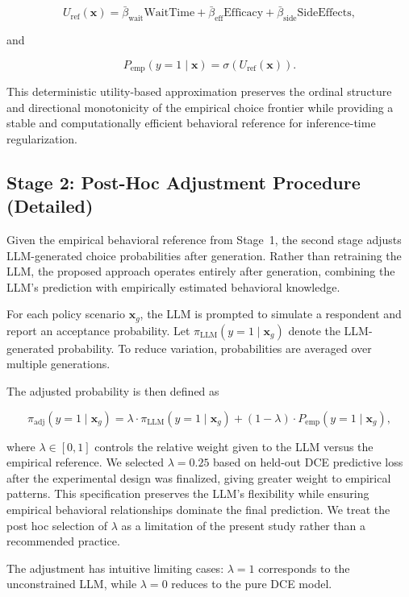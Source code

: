 \documentclass[11pt]{article}
\begin{document}
\[
U_{\mathrm{ref}}(\mathbf{x})
=
\bar{\beta}_{\mathrm{wait}}\mathrm{WaitTime}
+
\bar{\beta}_{\mathrm{eff}}\mathrm{Efficacy}
+
\bar{\beta}_{\mathrm{side}}\mathrm{SideEffects},
\]

and

\[
P_{\mathrm{emp}}(y=1\mid\mathbf{x})
=
\sigma\!\left(U_{\mathrm{ref}}(\mathbf{x})\right).
\]

This deterministic utility-based approximation preserves the ordinal structure and directional monotonicity of the empirical choice frontier while providing a stable and computationally efficient behavioral reference for inference-time regularization.
\subsection{Stage 2: Post-Hoc Adjustment Procedure (Detailed)}
\label{sec:stage2}

Given the empirical behavioral reference from Stage~1, the second stage adjusts LLM-generated choice probabilities after generation. Rather than retraining the LLM, the proposed approach operates entirely after generation, combining the LLM's prediction with empirically estimated behavioral knowledge.

For each policy scenario $\mathbf{x}_g$, the LLM is prompted to simulate a respondent and report an acceptance probability. Let $\pi_{\mathrm{LLM}}(y=1\mid\mathbf{x}_g)$ denote the LLM-generated probability. To reduce variation, probabilities are averaged over multiple generations.

The adjusted probability is then defined as

\begin{equation}
\pi_{\mathrm{adj}}(y=1\mid\mathbf{x}_g) = \lambda \cdot \pi_{\mathrm{LLM}}(y=1\mid\mathbf{x}_g) + (1-\lambda) \cdot P_{\mathrm{emp}}(y=1\mid\mathbf{x}_g),
\label{eq:adjustment}
\end{equation}

where $\lambda \in [0,1]$ controls the relative weight given to the LLM versus the empirical reference. We selected $\lambda = 0.25$ based on held-out DCE predictive loss after the experimental design was finalized, giving greater weight to empirical patterns. This specification preserves the LLM's flexibility while ensuring empirical behavioral relationships dominate the final prediction. We treat the post hoc selection of $\lambda$ as a limitation of the present study rather than a recommended practice.

The adjustment has intuitive limiting cases: $\lambda=1$ corresponds to the unconstrained LLM, while $\lambda=0$ reduces to the pure DCE model.
\end{document}
